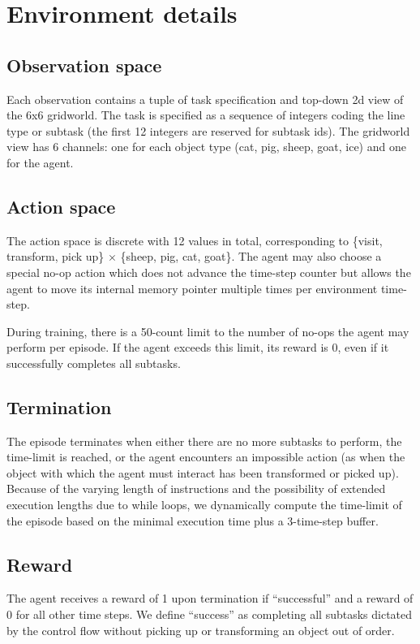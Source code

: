 \documentclass{article}
\begin{document}
\section{Environment details}
\subsection{Observation space}
Each observation contains a tuple of task specification and top-down 2d view of
the 6x6 gridworld. The task is specified as a sequence of integers coding the
line type or subtask (the first 12 integers are reserved for subtask ids). The
gridworld view has 6 channels: one for each object type (cat, pig, sheep, goat,
ice) and one for the agent.  
\subsection{Action space}
The action space is discrete with 12 values in total, corresponding to \{visit, transform, pick up\} $\times$ \{sheep, pig, cat, goat\}. The agent may also choose a special no-op action which does not advance the time-step counter but allows the agent to move its internal memory pointer  multiple times per environment time-step. 

During training, there is a 50-count limit to the number of no-ops the agent may perform per episode. If the agent exceeds this limit, its reward is 0, even if it successfully completes all subtasks. 
\subsection{Termination}
The episode terminates when either there are no more subtasks to perform, the time-limit is reached, or the agent encounters an impossible action (as when the object with which the agent must interact has been transformed or picked up).
Because of the varying length of instructions and the possibility of extended execution lengths due to while loops, we dynamically compute the time-limit of the episode based on the minimal execution time plus a 3-time-step buffer.
\subsection{Reward}
The agent receives a reward of 1 upon termination if ``successful'' and a reward of 0 for all other time steps. We define ``success'' as completing all subtasks dictated by the control flow without picking up or transforming an object out of order.
\end{document}
